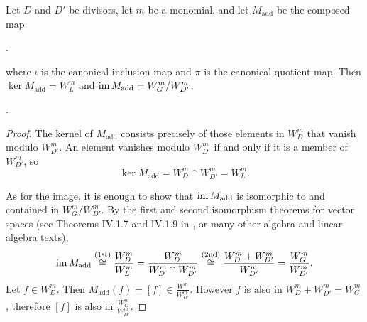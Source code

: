 \begin{theorem}
  Let $D$ and $D'$ be divisors, let $m$ be a monomial, and let $M_{\text{add}}$ be the composed map
  \begin{center}
    .
  \end{center}
  where $\iota$ is the canonical inclusion map and $\pi$ is the canonical quotient map.
  Then $\ker M_{\text{add}} = W_L^m$ and $\operatorname{im} M_{\text{add}} = W_G^m / W_{D'}^m$,
  \begin{center}
    .
  \end{center}
\end{theorem}
\begin{proof}
  The kernel of $M_{\text{add}}$ consists precisely of those elements in $W_D^m$ that vanish modulo $W_{D'}^m$.
  An element vanishes modulo $W_{D'}^m$ if and only if it is a member of $W_{D'}^m$, so
  \[ \ker M_{\text{add}} = W_D^m \cap W_{D'}^m = W_L^m. \]

  As for the image, it is enough to show that $\operatorname{im} M_{\text{add}}$ is isomorphic to and contained in $W_G^m / W_{D'}^m$.
  By the first and second isomorphism theorems for vector spaces
  (see Theorems IV.1.7 and IV.1.9 in \cite{hungerford}, or many other algebra and linear algebra texts),
  \[ \operatorname{im} M_{\text{add}} \overset{\text{(1st)}}{\cong} \frac {W_D^m} {W_L^m}
           = \frac {W_D^m} {W_D^m \cap W_{D'}^m}
           \overset{\text{(2nd)}}{\cong} \frac {W_D^m + W_{D'}^m} {W_{D'}^m}
           = \frac {W_G^m} {W_{D'}^m}. \]
  Let $f \in W_D^m$.
  Then $M_{\text{add}}(f) = [f] \in \frac {W^m} {W_{D'}^m}$.
  However $f$ is also in $W_D^m + W_{D'}^m = W_G^m$,
  therefore $[f]$ is also in $\frac {W_G^m} {W_{D'}^m}$.
\end{proof}

